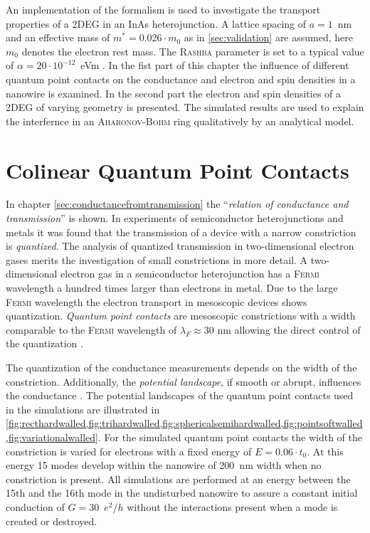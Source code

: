 An implementation of the \gfnc{} formalism is used to investigate the transport properties of a 2DEG in an InAs heterojunction. A lattice spacing of $a=1$~nm and an effective mass of $m^*=0.026 \cdot m_0$ as in \cref{sec:validation} are assumed, here $m_0$ denotes the electron rest mass. The \textsc{Rashba} parameter is set to a typical value of $\alpha = 20 \cdot 10^{-12}$~eVm \cite{Jacob2009Thesis}. In the fist part of this chapter the influence of different quantum point contacts on the conductance and electron and spin densities in a nanowire is examined. In the second part the electron and spin densities of a 2DEG of varying geometry is presented. The simulated results are used to explain the interfernce in an \textsc{Aharonov-Bohm} ring qualitatively by an analytical model.
\section{Colinear Quantum Point Contacts}
In chapter \ref{sec:conductancefromtransmission} the ``\emph{relation of conductance and transmission}'' \cite{landauer1996} is shown. In experiments of semiconductor heterojunctions \cite{vanHoutenBeenakker2005} and metals \cite{PhysRevB.36.1284} it was found that the transmission of a device with a narrow constriction is \emph{quantized}. The analysis of quantized transmission in two-dimensional electron gases merits the investigation of small constrictions in more detail. A two-dimensional electron gas in a semiconductor heterojunction has a \textsc{Fermi} wavelength a hundred times larger than electrons in metal. Due to the large \textsc{Fermi} wavelength the electron transport in mesoscopic devices shows quantization. \emph{Quantum point contacts} are mesoscopic constrictions with a width comparable to the \textsc{Fermi} wavelength of $\lambda_F \approx 30\text{~nm}$ allowing the direct control of the quantization \cite{vanHoutenBeenakker2005}.\par
The quantization of the conductance measurements depends on the width of the constriction. Additionally, the \emph{potential landscape}, if smooth or abrupt, influences the conductance \cite{PhysRevB.44.8017}. The potential landscapes of the quantum point contacts used in the simulations are illustrated in \cref{fig:recthardwalled,fig:trihardwalled,fig:sphericalsemihardwalled,fig:pointsoftwalled,fig:variationalwalled}.
For the simulated quantum point contacts the width of the constriction is varied for electrons with a fixed energy of $E=0.06\cdot t_0$. At this energy 15 modes develop within the nanowire of 200~nm width when no constriction is present. All simulations are performed at an energy between the 15th and the 16th mode in the undisturbed nanowire to assure a constant initial conduction of $G =30$~$e^2/h$ without the interactions present when a mode is created or destroyed.
